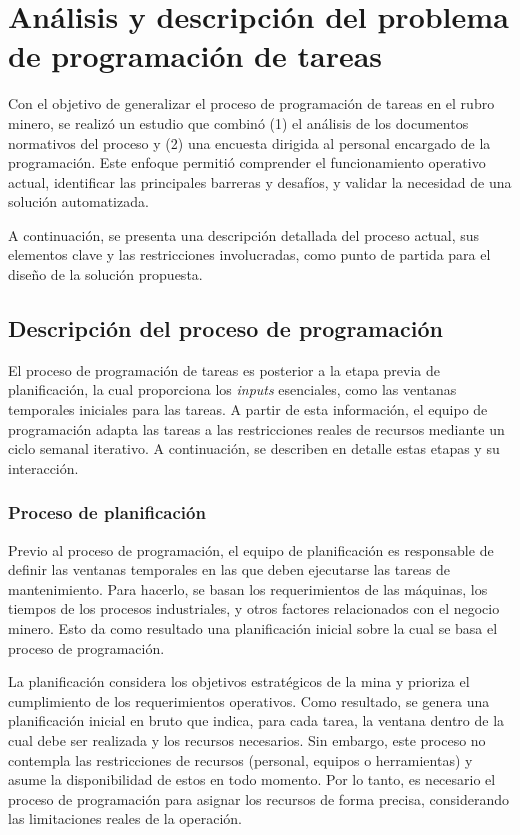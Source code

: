 \documentclass{article}
\begin{document}

\section{Análisis y descripción del problema de programación de tareas}

Con el objetivo de generalizar el proceso de programación de tareas en el rubro minero, se realizó un estudio que combinó (1) el análisis de los documentos normativos del proceso y (2) una encuesta dirigida al personal encargado de la programación. Este enfoque permitió comprender el funcionamiento operativo actual, identificar las principales barreras y desafíos, y validar la necesidad de una solución automatizada.

A continuación, se presenta una descripción detallada del proceso actual, sus elementos clave y las restricciones involucradas, como punto de partida para el diseño de la solución propuesta.


\subsection{Descripción del proceso de programación}

El proceso de programación de tareas es posterior a la etapa previa de planificación, la cual proporciona los \textit{inputs} esenciales, como las ventanas temporales iniciales para las tareas. A partir de esta información, el equipo de programación adapta las tareas a las restricciones reales de recursos mediante un ciclo semanal iterativo. A continuación, se describen en detalle estas etapas y su interacción.

\subsubsection{Proceso de planificación}

Previo al proceso de programación, el equipo de planificación es responsable de definir las ventanas temporales en las que deben ejecutarse las tareas de mantenimiento. Para hacerlo, se basan los requerimientos de las máquinas, los tiempos de los procesos industriales, y otros factores relacionados con el negocio minero. Esto da como resultado una planificación inicial sobre la cual se basa el proceso de programación.

La planificación considera los objetivos estratégicos de la mina y prioriza el cumplimiento de los requerimientos operativos. Como resultado, se genera una planificación inicial en bruto que indica, para cada tarea, la ventana dentro de la cual debe ser realizada y los recursos necesarios. Sin embargo, este proceso no contempla las restricciones de recursos (personal, equipos o herramientas) y asume la disponibilidad de estos en todo momento. Por lo tanto, es necesario el proceso de programación para asignar los recursos de forma precisa, considerando las limitaciones reales de la operación.
\end{document}
